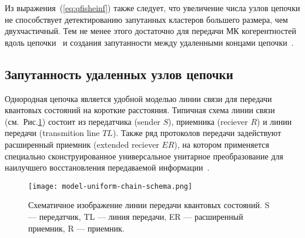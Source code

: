 Из выражения~(\ref{eq:qfisheinf}) также следует,
что увеличение числа узлов цепочки не способствует детектированию запутанных кластеров большего размера, чем двухчастичный.
Тем не менее этого достаточно для передачи МК когерентностей вдоль цепочки~\cite{Bochkin2018qip} и создания запутанности между удаленными концами цепочки~\cite{Lazarev2019}.

\subsection{Запутанность удаленных узлов цепочки}
\label{subsec:entanglement-of-remote-chain-nodes}
Однородная цепочка является удобной моделью линии связи для передачи квантовых состояний на короткие расстояния.
Типичная схема линии связи (см.~Рис.\ref{fig:model-uniform-chain-schema}) состоит из передатчика (sender $S$),
приемника (reciever $R$)
и линии передачи (transmition line $TL$).
Также ряд протоколов передачи задействуют расширенный приемник (extended reciever $ER$),
на котором применяется специально сконструированное универсальное унитарное преобразование для наилучшего восстановления передаваемой информации~\cite{Feldman2021}.

\begin{figure}[H]
  \centering
  \texttt{[image: model-uniform-chain-schema.png]}
  \caption{
    Схематичное изображение линии передачи квантовых состояний.
    S --- передатчик,
    TL --- линия передачи,
    ER --- расширенный приемник,
    R --- приемник.
  }
  \label{fig:model-uniform-chain-schema}
\end{figure}

